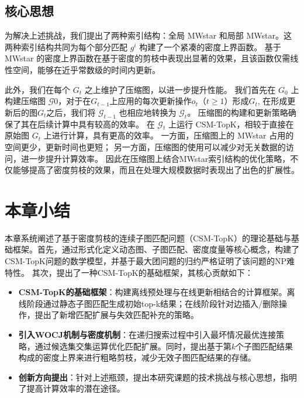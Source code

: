 \subsection{核心思想}
为解决上述挑战，我们提出了两种索引结构：全局 MWstar 和局部 MWstar。这两种索引结构共同为每个部分匹配 $g^i$ 构建了一个紧凑的密度上界函数。
基于 MWstar 的密度上界函数在基于密度的剪枝中表现出显著的效果，且该函数仅需线性空间，能够在近乎常数级的时间内更新。

此外，我们在每个 $G_t$ 之上维护了压缩图，以进一步提升性能。
我们首先在 $G_0$ 上构建压缩图 $\mathcal{G}0$，对于在$G_{t-1}$上应用的每次更新操作$o_t$（$t \geq 1$）形成$G_t$,
在形成更新后的图$G_t$之后，我们将 $\mathcal{G}_{t-1}$ 也相应地转换为 $\mathcal{G}_t$。
压缩图的构建和更新策略确保了其在后续计算中具有较高的效率。
在 $\mathcal{G}_t$ 上运行 CSM-TopK，相较于直接在原始图 $G_t$ 上进行计算，具有更高的效率。
一方面，压缩图上的 MWstar 占用的空间更少，更新时间也更短；
另一方面，压缩图的使用可以减少对无关数据的访问，进一步提升计算效率。
因此在压缩图上结合MWstar索引结构的优化策略，不仅能够提高了密度剪枝的效果，而且在处理大规模数据时表现出了出色的扩展性。
\section{本章小结}
本章系统阐述了基于密度剪枝的连续子图匹配问题（CSM-TopK）的理论基础与基础框架。首先，通过形式化定义动态图、子图匹配、密度度量等核心概念，构建了CSM-TopK问题的数学模型，并基于最大团问题的归约严格证明了该问题的NP难特性。
其次，提出了一种CSM-TopK的基础框架，其核心贡献如下：
\begin{itemize}
\item \textbf{CSM-TopK的基础框架}：构建离线预处理与在线更新相结合的计算框架。离线阶段通过静态子图匹配生成初始top-k结果；在线阶段针对边插入/删除操作，提出了新增匹配扩展与失效匹配补充的策略。

\item \textbf{引入WOCJ机制与密度机制}：在递归搜索过程中引入最坏情况最优连接策略，通过候选集交集运算优化匹配扩展。同时，提出基于第$k$个子图匹配结果构成的密度上界来进行粗略剪枝，减少无效子图匹配结果的存储。

\item \textbf{创新方向提出}：针对上述瓶颈，提出本研究课题的技术挑战与核心思想，指明了提高计算效率的潜在途径。
\end{itemize}    

